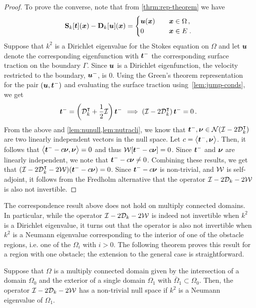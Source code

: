 \begin{proof}
To prove the converse, note that from \cref{thrm:rep-theorem} we have 
  \begin{equation} 
    {\bf S}_{k} [{\boldsymbol t}]({\boldsymbol x}) - {\bf D}_{k}[{\boldsymbol u}]({\boldsymbol x}) = \begin{cases} 
    {\boldsymbol u}({\boldsymbol x}) &\quad {\boldsymbol x} \in \Omega \, , \\
    0 &\quad {\boldsymbol x} \in E \; .
    \end{cases}
  \end{equation}
  Suppose that $k^2$ is a Dirichlet eigenvalue for the Stokes equation
  on $\Omega$ and let ${\boldsymbol u}$ denote the corresponding eigenfunction
  with ${\boldsymbol t}^{-}$ the corresponding surface traction on the
  boundary $\Gamma$.
  Since ${\boldsymbol u}$ is a Dirichlet eigenfunction, the velocity restricted
  to the boundary, ${\boldsymbol u}^{-}$, is $0$. 
  Using the Green's theorem representation for the pair
  $({\boldsymbol u},{\boldsymbol t}^{-})$ and evaluating the surface traction
  using~\cref{lem:jump-conds}, we get
  \begin{equation}
    {\boldsymbol t}^{-} = \left({\mathcal D}^{\intercal}_{k} + \frac{1}{2} \mathcal I\right) {\boldsymbol t}^{-} \,
    \implies \left(\mathcal I - 2{\mathcal D}^{\intercal}_{k} \right) 
    {\boldsymbol t}^{-} = 0 \, .
  \end{equation}
  From the above and \cref{lem:nunull,lem:nutracli},
  we know that ${\boldsymbol t}^{-}, {\boldsymbol \nu} \in {\mathcal N}(\mathcal I - 2{\mathcal D}^{\intercal}_{k})$
  are two linearly independent vectors in the null space.
  Let $c = \left< {\boldsymbol t}^{-},{\boldsymbol \nu} \right>$. Then, it
  follows that $\left<{\boldsymbol t}^{-} -c {\boldsymbol \nu}, {\boldsymbol \nu} \right> = 0$
  and thus ${\mathcal W}[{\boldsymbol t}^{-} - c{\boldsymbol \nu}] = 0$. 
  Since ${\boldsymbol t}^{-}$ and ${\boldsymbol \nu}$ are linearly independent, we note that
  ${\boldsymbol t}^{-} -c{\boldsymbol \nu} \neq 0$. Combining these results, we get that
  $(\mathcal I - 2{\mathcal D}^{\intercal}_{k} - 2{\mathcal W}) ({\boldsymbol t}^{-} - c{\boldsymbol \nu}) = 0$. 
  Since ${\boldsymbol t}^{-}-c{\boldsymbol \nu}$ is non-trivial, and ${\mathcal W}$ is
  self-adjoint, it follows from the Fredholm alternative
  that the operator $\mathcal I - 2{\mathcal D}_{k} - 2{\mathcal W}$ is also not
  invertible.
\end{proof}

The correspondence result above does not hold on multiply
connected domains.
In particular, while the operator $\mathcal I -2{\mathcal D}_{k} -2{\mathcal W}$ 
is indeed not invertible when $k^2$ is a Dirichlet eigenvalue,
it turns out that the operator is also not
invertible when $k^2$ is a Neumann eigenvalue
corresponding to the interior of one of the obstacle regions,
i.e. one of the $\Omega_{i}$ with $i > 0$. The following theorem
proves this result for a region with one obstacle;
the extension to the general case is straightforward.

\begin{thrm}
  Suppose that $\Omega$ is a multiply connected domain
  given by the intersection of a domain $\Omega_{0}$
  and the exterior of a single domain $\Omega_{1}$ with
  $ \bar\Omega_1 \subset \Omega_0$.
  Then, the operator $\mathcal I - 2{\mathcal D}_{k} - 2{\mathcal W}$ has a non-trivial
  null space if $k^2$ is a Neumann eigenvalue of $\Omega_{1}$.
\end{thrm}

